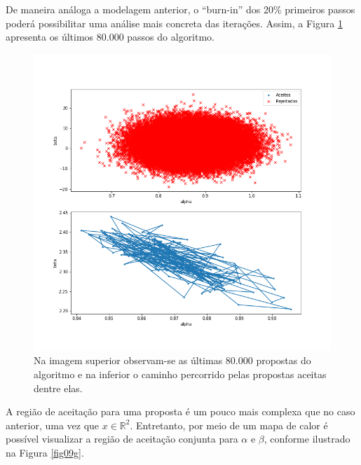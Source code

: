 \documentclass[11pt,letterpaper,twocolumn]{article}
\begin{document}
De maneira análoga a modelagem anterior, o ``burn-in'' dos 20\% primeiros passos poderá possibilitar uma análise mais concreta das iterações. Assim, a Figura \ref{fig06g} apresenta os últimos 80.000 passos do algoritmo.
\begin{figure}[hbt]
    \centering
    \includegraphics[scale = 0.40, center]{Gamma/fig06 - gamma.png}
    \caption{Na imagem superior observam-se as últimas 80.000 propostas do algoritmo e na inferior o caminho percorrido pelas propostas aceitas dentre elas.}
    \label{fig06g}
\end{figure}

A região de aceitação para uma proposta é um pouco mais complexa que no caso anterior, uma vez que $x\in \mathbb{R}^2$. Entretanto, por meio de um mapa de calor é possível visualizar a região de aceitação conjunta para $\alpha$ e $\beta$, conforme ilustrado na Figura \ref{fig09g}.
\end{document}
